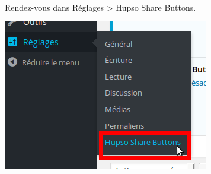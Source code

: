 \documentclass[10pt,a4paper]{article}
\begin{document}
\paragraph{}Rendez-vous dans Réglages > Hupso Share Buttons.
\begin{center}
\includegraphics[scale=0.3]{img/0176.png}
\end{center}
\end{document}
